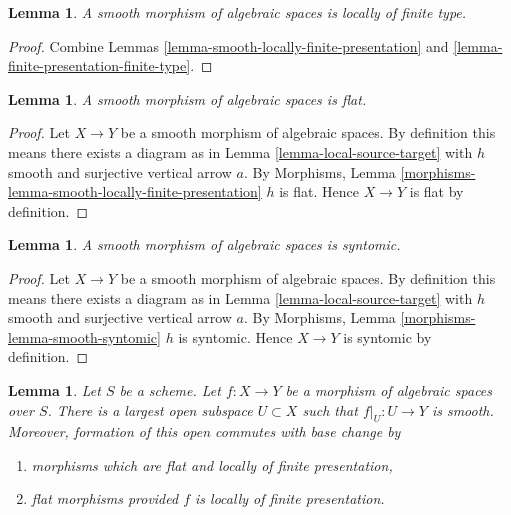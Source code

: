 \documentclass{stacks-project}
\theoremstyle{plain}
\newtheorem{lemma}[subsection]{Lemma}
\theoremstyle{definition}
\theoremstyle{remark}
\numberwithin{equation}{subsection}
\begin{document}
\begin{lemma}
\label{lemma-smooth-locally-finite-type}
A smooth morphism of algebraic spaces is locally of finite type.
\end{lemma}

\begin{proof}
Combine
Lemmas \ref{lemma-smooth-locally-finite-presentation} and
\ref{lemma-finite-presentation-finite-type}.
\end{proof}

\begin{lemma}
\label{lemma-smooth-flat}
A smooth morphism of algebraic spaces is flat.
\end{lemma}

\begin{proof}
Let $X \to Y$ be a smooth morphism of algebraic spaces. By
definition this means there exists a diagram as in
Lemma \ref{lemma-local-source-target}
with $h$ smooth and surjective vertical arrow $a$. By
Morphisms, Lemma \ref{morphisms-lemma-smooth-locally-finite-presentation}
$h$ is flat. Hence $X \to Y$ is flat by definition.
\end{proof}

\begin{lemma}
\label{lemma-smooth-syntomic}
A smooth morphism of algebraic spaces is syntomic.
\end{lemma}

\begin{proof}
Let $X \to Y$ be a smooth morphism of algebraic spaces. By
definition this means there exists a diagram as in
Lemma \ref{lemma-local-source-target}
with $h$ smooth and surjective vertical arrow $a$. By
Morphisms, Lemma \ref{morphisms-lemma-smooth-syntomic}
$h$ is syntomic. Hence $X \to Y$ is syntomic by definition.
\end{proof}

\begin{lemma}
\label{lemma-where-smooth}
Let $S$ be a scheme. Let $f : X \to Y$ be a morphism of algebraic
spaces over $S$. There is a largest open subspace $U \subset X$
such that $f|_U : U \to Y$ is smooth. Moreover, formation of
this open commutes with base change by
\begin{enumerate}
\item morphisms which are flat and
locally of finite presentation,
\item flat morphisms provided $f$ is locally of finite presentation.
\end{enumerate}
\end{lemma}
\end{document}
